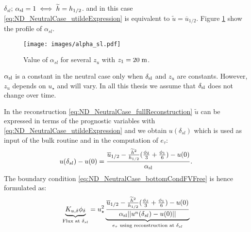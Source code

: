 $\delta_{sl}$; $\alpha_{\rm sl} = 1 \iff \widetilde{h}=h_{1/2}$.
and in this case \eqref{eq:ND_NeutralCase_utildeExpression} is
equivalent to $\widetilde{u} = \overline{u}_{1/2}$.
Figure \ref{fig:ND_NeutralCase_alpha_sl} show the
profile of $\alpha_{sl}$.
\begin{figure}
	\centering
	\texttt{[image: images/alpha\_sl.pdf]}
	\caption
	{ Value of $\alpha_{sl}$
	for several $z_u$ with $z_1=20\;{\rm m}$.
	}
	\label{fig:ND_NeutralCase_alpha_sl}
\end{figure}
\begin{remark}
$\alpha_{\rm sl}$ is a constant in the neutral case
only when $\delta_{\rm sl}$ and $z_{u}$ are constants. However,
$z_{u}$ depends on $u_\star$ and will vary.
In all this thesis we assume that $\delta_{\rm sl}$ does not
change over time.
\end{remark}
%
In the reconstruction \eqref{eq:ND_NeutralCase_fullReconstruction}
$\widetilde{u}$ can be expressed in terms of the prognostic
variables with \eqref{eq:ND_NeutralCase_utildeExpression}
and we obtain $u(\delta_{sl})$ which is used as input
of the bulk routine and in the computation of $e_\tau$:
\begin{equation}
u(\delta_{sl})-u(0)=\frac{\overline{u}_{1/2} -
	\frac{\widetilde{h}^2}{h_{1/2}}
	(\frac{\phi_{\delta}}{3} + \frac{\phi_1}{6}) - u(0)}
	{\alpha_{\rm sl}}.
\end{equation}
The boundary condition \eqref{eq:ND_NeutralCase_bottomCondFVFree}
is hence formulated as:
\begin{equation}
	\label{eq:ND_NeutralCase_boundaryCondFVfree}
	\underbrace{K_{u,\delta} \phi_{\delta}}_{
		\text{Flux at } \delta_{sl}
	} = u_\star^2
	\underbrace{\frac{\overline{u}_{1/2} -
	\frac{\widetilde{h}^2}{h_{1/2}}
	(\frac{\phi_{\delta}}{3} + \frac{\phi_1}{6})-u(0)}
	{\alpha_{\rm sl}||u^n(\delta_{sl}) - u(0)||}}_{
		e_\tau \text{ using reconstruction at } \delta_{sl}
	}
\end{equation}
% 
